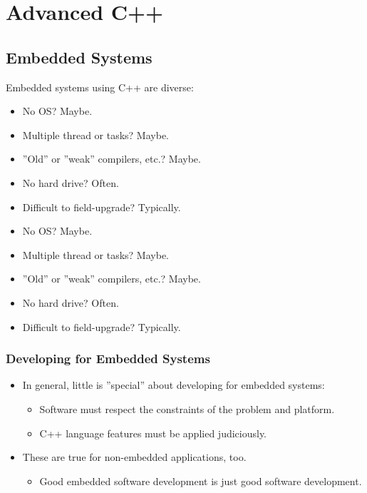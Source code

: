 \section{Advanced C++}

\subsection{Embedded Systems}
Embedded systems using C++ are diverse:
\begin{multicols}{2}
\begin{itemize}
	\item No OS? Maybe.
	\item Multiple thread or tasks? Maybe.
	\item ''Old'' or ''weak'' compilers, etc.? Maybe.
	\item No hard drive? Often.
	\item Difficult to field-upgrade? Typically.
\end{itemize}
\columnbreak
\begin{itemize}
	\item No OS? Maybe.
	\item Multiple thread or tasks? Maybe.
	\item ''Old'' or ''weak'' compilers, etc.? Maybe.
	\item No hard drive? Often.
	\item Difficult to field-upgrade? Typically.
\end{itemize}
\end{multicols}
\subsubsection{Developing for Embedded Systems}
\begin{itemize}
	\item In general, little is ''special'' about developing for embedded systems:
	\begin{itemize}
		\item Software must respect the constraints of the problem and platform.
		\item C++ language features must be applied judiciously.
	\end{itemize}
	\item These are true for non-embedded applications, too.
	\begin{itemize}
		\item Good embedded software development is just good software development.
	\end{itemize}
\end{itemize}

